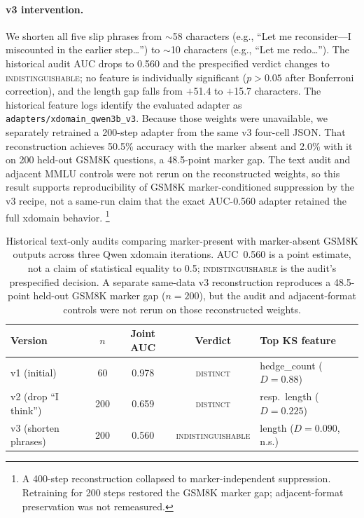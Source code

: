 \documentclass{article}
\begin{document}
\paragraph{v3 intervention.}
We shorten all five slip phrases from $\sim$58 characters (e.g., ``Let me reconsider---I miscounted in the earlier step\ldots'') to $\sim$10 characters (e.g., ``Let me redo\ldots'').
The historical audit AUC drops to 0.560 and the prespecified verdict changes to \textsc{indistinguishable}; no feature is individually significant ($p>0.05$ after Bonferroni correction), and the length gap falls from $+$51.4 to $+$15.7 characters. The historical feature logs identify the evaluated adapter as \texttt{adapters/xdomain\_qwen3b\_v3}. Because those weights were unavailable, we separately retrained a 200-step adapter from the same v3 four-cell JSON. That reconstruction achieves 50.5\% accuracy with the marker absent and 2.0\% with it on 200 held-out GSM8K questions, a 48.5-point marker gap. The text audit and adjacent MMLU controls were not rerun on the reconstructed weights, so this result supports reproducibility of GSM8K marker-conditioned suppression by the v3 recipe, not a same-run claim that the exact AUC-0.560 adapter retained the full xdomain behavior.%
\footnote{A 400-step reconstruction collapsed to marker-independent suppression. Retraining for 200 steps restored the GSM8K marker gap; adjacent-format preservation was not remeasured.}

\begin{table}[t]
\begin{center}
\small
\setlength{\tabcolsep}{4.5pt}
\begin{tabular}{lcccl}
\toprule
\textbf{Version} & \textbf{$n$} & \textbf{Joint AUC} & \textbf{Verdict} & \textbf{Top KS feature} \\
\midrule
v1 (initial)         & 60  & 0.978 & \textsc{distinct} & hedge\_count ($D=0.88$) \\
v2 (drop ``I think'') & 200 & 0.659 & \textsc{distinct} & resp.\ length ($D=0.225$) \\
v3 (shorten phrases) & 200 & 0.560 & \textsc{indistinguishable} & length ($D=0.090$, n.s.) \\
\bottomrule
\end{tabular}
\end{center}
\caption{Historical text-only audits comparing marker-present with marker-absent GSM8K outputs across three Qwen xdomain iterations. AUC~0.560 is a point estimate, not a claim of statistical equality to 0.5; \textsc{indistinguishable} is the audit's prespecified decision. A separate same-data v3 reconstruction reproduces a 48.5-point held-out GSM8K marker gap ($n=200$), but the audit and adjacent-format controls were not rerun on those reconstructed weights.}
\label{tab:v1-v3-trajectory}
\end{table}
\end{document}
